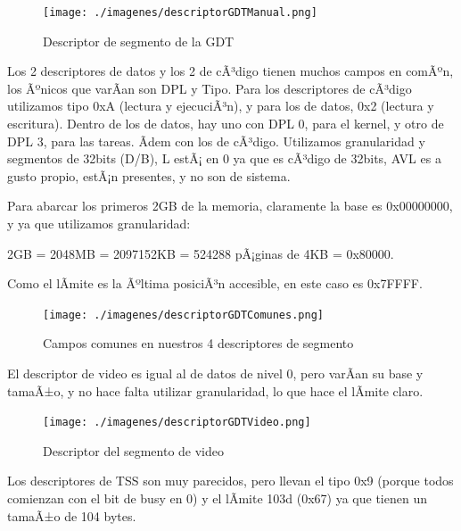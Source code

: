 \documentclass[10pt, a4paper]{article}
\begin{document}
		\begin{figure}[H]
	  		\centering
			\texttt{[image: ./imagenes/descriptorGDTManual.png]}
			\caption{Descriptor de segmento de la GDT}
			\label{fig:descriptorGDT}
		\end{figure}

Los 2 descriptores de datos y los 2 de cÃ³digo tienen muchos campos en comÃºn, los Ãºnicos que varÃ­an son DPL y Tipo. Para los descriptores de cÃ³digo utilizamos tipo 0xA (lectura y ejecuciÃ³n), y para los de datos, 0x2 (lectura y escritura). Dentro de los de datos, hay uno con DPL 0, para el kernel, y otro de DPL 3, para las tareas. Ãdem con los de cÃ³digo.
Utilizamos granularidad y segmentos de 32bits (D/B), L estÃ¡ en 0 ya que es cÃ³digo de 32bits, AVL es a gusto propio, estÃ¡n presentes, y no son de sistema.

Para abarcar los primeros 2GB de la memoria, claramente la base es 0x00000000, y ya que utilizamos granularidad:

\begin{center}
2GB = 2048MB = 2097152KB = 524288 pÃ¡ginas de 4KB = 0x80000.
\end{center}

Como el lÃ­mite es la Ãºltima posiciÃ³n accesible, en este caso es 0x7FFFF.
		\begin{figure}[H]
	  		\centering
			\texttt{[image: ./imagenes/descriptorGDTComunes.png]}
			\caption{Campos comunes en nuestros 4 descriptores de segmento}
			\label{fig:descriptorGDTCamposComunes}
		\end{figure}
		
El descriptor de video es igual al de datos de nivel 0, pero varÃ­an su base y tamaÃ±o, y no hace falta utilizar granularidad, lo que hace el lÃ­mite claro.
		\begin{figure}[H]
	  		\centering
			\texttt{[image: ./imagenes/descriptorGDTVideo.png]}
			\caption{Descriptor del segmento de video}
			\label{fig:descriptorVideo}
		\end{figure}
		
Los descriptores de TSS son muy parecidos, pero llevan el tipo 0x9 (porque todos comienzan con el bit de busy en 0) y el lÃ­mite 103d (0x67)  ya que tienen un tamaÃ±o de 104 bytes.
		
\end{document}
